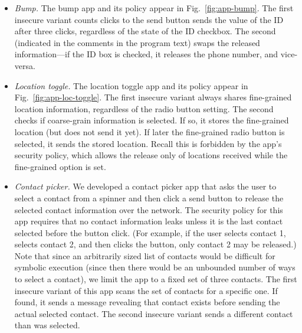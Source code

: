 \begin{itemize}%
\item \textit{Bump.} The bump app and its policy appear in
  Fig.~\ref{fig:app-bump}. The first insecure variant counts clicks to
  the send button sends the value of the
  ID after three clicks, regardless of the state of the ID
  checkbox. The second (indicated in the comments in the program text)
  swaps the released information---if the ID
  box is checked, it releases the phone number, and vice-versa.

\item \textit{Location toggle.} The location toggle app and
  its policy appear in Fig.~\ref{fig:app-loc-toggle}. The first insecure
  variant always shares fine-grained location information, regardless
  of the radio button setting. The second checks if coarse-grain
  information is selected. If so, it stores the fine-grained location
  (but does not send it yet).  If later the fine-grained radio button
  is selected, it sends the stored location. Recall this is forbidden
  by the app's security policy, which allows the release only of locations
  received while the fine-grained option is set.

\item \textit{Contact picker.} We developed a contact picker app
  that asks the user to select a contact from a spinner and then
  click a send button to release the selected contact information over the
  network. The security policy for this app requires that no contact
  information leaks unless it is the last contact selected before the
  button click. (For example, if the user selects contact 1,
  selects contact 2, and then clicks the button, only contact 2 may be
  released.) Note that since an arbitrarily sized list of contacts
  would be difficult for symbolic execution (since then there would be
  an unbounded number of ways to select a contact), we limit the app
  to a fixed set of three contacts.
  The first insecure variant of this app scans the set of contacts for a
  specific one. If found, it sends a message revealing that contact
  exists before sending the actual selected contact. The second insecure
  variant sends a different contact than was selected.


\end{itemize}
